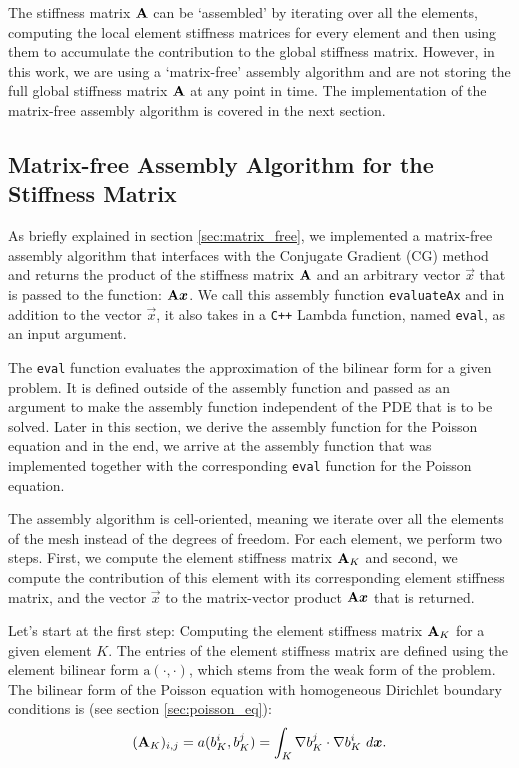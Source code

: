 The stiffness matrix $\mathbf{A}$ can be `assembled' by iterating over all the elements,
computing the local element stiffness matrices for every element and then
using them to accumulate the contribution to the global stiffness matrix.
However, in this work, we are using a `matrix-free' assembly algorithm and are
not storing the full global stiffness matrix $\mathbf{A}$ at any point in time.
The implementation of the matrix-free assembly algorithm is covered in the next section.

\subsection{Matrix-free Assembly Algorithm for the Stiffness Matrix}

As briefly explained in section \ref{sec:matrix_free}, we implemented a
matrix-free assembly algorithm that interfaces with the Conjugate Gradient (CG)
method and returns the product of the stiffness matrix $\mathbf{A}$ and an
arbitrary vector $\vec{x}$ that is passed to the function: $\mathbf{A}\boldsymbol{x}$.
We call this assembly function \texttt{evaluateAx}
and in addition to the vector $\vec{x}$, it also takes in
a \texttt{C++} Lambda function, named \texttt{eval}, as an input argument.

The \texttt{eval} function evaluates the approximation of the bilinear form
for a given problem. It is defined outside of the assembly function and
passed as an argument to make the assembly function independent of the PDE
that is to be solved.
Later in this section, we derive the assembly function for the Poisson
equation and in the end, we arrive at the assembly function that was implemented
together with the corresponding \texttt{eval} function for the Poisson equation.

The assembly algorithm is cell-oriented, meaning we iterate over all the elements
of the mesh instead of the degrees of freedom. For each element, we perform two
steps. First, we compute the element stiffness matrix $\mathbf{A}_K$ and second,
we compute the contribution of this element with its corresponding element stiffness matrix,
and the vector $\vec{x}$ to the matrix-vector product $\mathbf{A}\boldsymbol{x}$ that is returned.


Let's start at the first step: Computing the element stiffness matrix $\mathbf{A}_K$ for a given element $K$.
The entries of the element stiffness matrix are defined using the element bilinear form $\mathrm{a}(\cdot, \cdot)$,
which stems from the weak form of the problem.
The bilinear form of the Poisson equation with homogeneous Dirichlet boundary conditions is (see section \ref{sec:poisson_eq}):
\begin{align}
    (\mathbf{A}_K)_{i,j} = a(b_K^i, b_K^j) = \int_K \nabla b_K^j \cdot \nabla b_K^i \ d\boldsymbol{x}.
\end{align}


